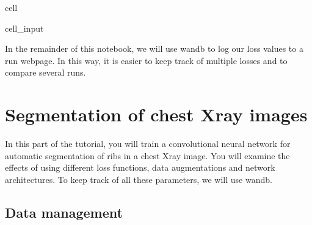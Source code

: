 \documentclass[letterpaper,10pt,english]{jupyterBook}
\begin{document}
\begin{sphinxuseclass}{cell}\begin{sphinxVerbatimInput}

\begin{sphinxuseclass}{cell_input}
\begin{sphinxVerbatim}[commandchars=\\\{\}]
 
 

   
       
    
\end{sphinxVerbatim}

\end{sphinxuseclass}\end{sphinxVerbatimInput}

\end{sphinxuseclass}
\sphinxAtStartPar
In the remainder of this notebook, we will use wandb to log our loss values to a run webpage. In this way, it is easier to keep track of multiple losses and to compare several runs.


\chapter{Segmentation of chest X\sphinxhyphen{}ray images}
\label{\detokenize{notebooks/Tutorial3_Segmentation/Tutorial3_Segmentation_student:segmentation-of-chest-x-ray-images}}
\sphinxAtStartPar
In this part of the tutorial, you will train a convolutional neural network for automatic segmentation of ribs in a chest X\sphinxhyphen{}ray image. You will examine the effects of using different loss functions, data augmentations and network architectures. To keep track of all these parameters, we will use wandb.


\section{Data management}
\label{\detokenize{notebooks/Tutorial3_Segmentation/Tutorial3_Segmentation_student:data-management}}
\end{document}
